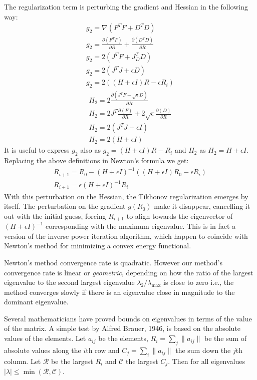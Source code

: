 \documentclass{birkjour}
\numberwithin{equation}{section}
\begin{document}
The regularization term is perturbing the gradient and Hessian in the following way:
\begin{eqnarray*}
g_2 = \nabla(F^T F + D^T D)\\
g_2 = \frac{\partial (F^T F)}{\partial R} + \frac{\partial (D^T D)}{\partial R}\\
g_2 = 2 (J^T F + J_D^T D)\\
g_2 = 2 (J^T J + \epsilon D)\\
g_2 = 2 ((H + \epsilon I) R - \epsilon R_i)
\end{eqnarray*}
\begin{eqnarray*}
H_2 = 2 \frac{\partial(J^T F + \sqrt{\epsilon} D)}{\partial R} \\
H_2 = 2 J^T \frac{\partial(F)}{\partial R} + 2 \sqrt{\epsilon} \frac{\partial(D)}{\partial R}\\
H_2 = 2 (J^T J + \epsilon I)\\
H_2 = 2 (H + \epsilon I)
\end{eqnarray*}
It is useful to express $g_2$ also as $g_2 = (H + \epsilon I) R - R_i$ and $H_2$ as $H_2 = H + \epsilon I$.  
Replacing the above definitions in Newton's formula we get:
\begin{eqnarray*}
R_{i+1} = R_0 - (H + \epsilon I)^{-1} ((H + \epsilon I) R_0 - \epsilon R_i)\\
R_{i+1} = \epsilon (H + \epsilon I)^{-1} R_i
\end{eqnarray*}
With this perturbation on the Hessian, the Tikhonov regularization emerges by itself. 
The perturbation on the gradient $g(R_0)$ make it disappear, cancelling it out with the initial guess,
forcing $R_{i+1}$ to align towards the eigenvector of $(H + \epsilon I)^{-1}$ corresponding with the maximum eigenvalue.
This is in fact a version of the inverse power iteration algorithm, which happen to coincide with Newton's method for minimizing a convex energy functional. 

Newton's method convergence rate is quadratic. However our method's convergence rate is linear or \emph{geometric}, depending on how the ratio of the largest eigenvalue to the second largest eigenvalue $\lambda_2 / \lambda_{\max}$ is close to zero i.e., the method converges slowly if there is an eigenvalue close in magnitude to the dominant eigenvalue.

Several mathematicians have proved bounds on eigenvalues in terms of the value of the matrix. A simple test by Alfred Brauer, 1946, is based on the absolute values of the elements. Let $a_{ij}$ be the elements, $R_i = \sum_j \|a_{ij}\|$ be the sum of absolute values along the $i$th row and $C_j = \sum_i\|a_{ij}\|$ the sum down the $j$th column. Let $\mathcal R$ be the largest $R_i$ and $\mathcal C$ the largest $C_j$. Then for all eigenvalues $|\lambda| \leq \min(\mathcal R, \mathcal C)$.
\end{document}
